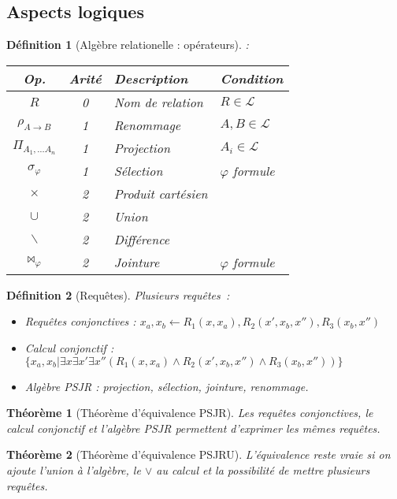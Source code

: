 \documentclass[landscape]{article}
\renewcommand{\L}{\mathscr{L}}
\newcommand{\1}{\mathbbm{1}}
\newcommand{\0}{\mathbbm{0}}
\renewcommand{\phi}{\varphi}
\newtheorem{theo}{Théorème}
\newtheorem{defi}{Définition}
\begin{document}
\begin{multicols}{2}
    \section{Aspects logiques}

    \begin{defi}[Algèbre relationelle : opérateurs]:\\
        \begin{tabular}{ccll}
            \hline
            Op. & Arité & Description & Condition \\
            \hline
            $R$ & 0 & Nom de relation & $R \in \L$ \\
            $\rho_{A\rightarrow B}$ & 1 & Renommage & $A,B\in\L$ \\
            $\Pi_{A_1,\ldots A_n}$ & 1 & Projection & $A_i\in\L$ \\
            $\sigma_\phi$ & 1 & Sélection & $\phi$ formule \\
            $\times$ & 2 & Produit cartésien & \\
            $\cup$ & 2 & Union & \\
            $\backslash$ & 2 & Différence & \\
            $\bowtie_\phi$ & 2 & Jointure & $\phi$ formule \\
            \hline
        \end{tabular}
    \end{defi}

    \begin{defi}[Requêtes] Plusieurs requêtes~:
    \begin{itemize}
        \item Requêtes conjonctives : $x_a, x_b \leftarrow R_1(x, x_a), R_2(x', x_b, x''), R_3(x_b, x'')$
        \item Calcul conjonctif : $\{x_a, x_b | \exists x \exists x' \exists x''(R_1(x, x_a)\wedge R_2(x', x_b, x'')\wedge R_3(x_b, x'')) \}$
        \item Algèbre PSJR : projection, sélection, jointure, renommage.
    \end{itemize}\end{defi}

    \begin{theo}[Théorème d'équivalence PSJR]
        Les requêtes conjonctives, le calcul conjonctif et l'algèbre PSJR permettent
        d'exprimer les mêmes requêtes.
    \end{theo}

    \begin{theo}[Théorème d'équivalence PSJRU]
        L'équivalence reste vraie si on ajoute l'union à l'algèbre, le $\vee$ au
        calcul et la possibilité de mettre plusieurs requêtes.
    \end{theo}


\end{multicols}
\end{document}
